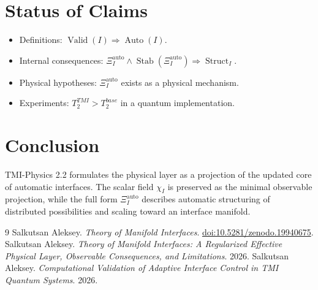 \documentclass[12pt,a4paper]{article}
\DeclareMathOperator{\Struct}{Struct}
\DeclareMathOperator{\Valid}{Valid}
\DeclareMathOperator{\Auto}{Auto}
\DeclareMathOperator{\Stab}{Stab}
\newcommand{\XiAuto}{\Xi_I^{\mathrm{auto}}}
\begin{document}
\section{Status of Claims}
\begin{itemize}
\item Definitions: \(\Valid(I)\Rightarrow\Auto(I)\).
\item Internal consequences: \(\XiAuto\land\Stab(\XiAuto)\Rightarrow\Struct_I\).
\item Physical hypotheses: \(\XiAuto\) exists as a physical mechanism.
\item Experiments: \(T_2^{TMI}>T_2^{base}\) in a quantum implementation.
\end{itemize}

\section{Conclusion}
TMI-Physics 2.2 formulates the physical layer as a projection of the updated core of automatic interfaces. The scalar field \(\chi_I\) is preserved as the minimal observable projection, while the full form \(\XiAuto\) describes automatic structuring of distributed possibilities and scaling toward an interface manifold.

\begin{thebibliography}{9}
 Salkutsan Aleksey. \textit{Theory of Manifold Interfaces}. \href{https://doi.org/10.5281/zenodo.19940675}{doi:10.5281/zenodo.19940675}.
 Salkutsan Aleksey. \textit{Theory of Manifold Interfaces: A Regularized Effective Physical Layer, Observable Consequences, and Limitations}. 2026.
 Salkutsan Aleksey. \textit{Computational Validation of Adaptive Interface Control in TMI Quantum Systems}. 2026.
\end{thebibliography}
\end{document}
